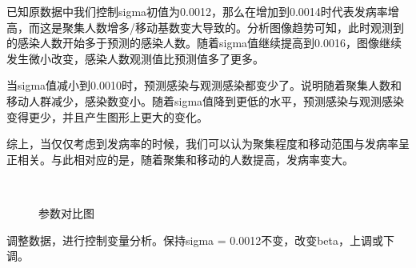 \documentclass{cumcmthesis}
\begin{document}
已知原数据中我们控制sigma初值为0.0012，那么在增加到0.0014时代表发病率增高，而这是聚集人数增多/移动基数变大导致的。分析图像趋势可知，此时观测到的感染人数开始多于预测的感染人数。随着sigma值继续提高到0.0016，图像继续发⽣微小改变，感染人数观测值比预测值多了更多。

当sigma值减小到0.0010时，预测感染与观测感染都变少了。说明随着聚集人数和移动人群减少，感染数变小。随着sigma值降到更低的水平，预测感染与观测感染变得更少，并且产生图形上更⼤的变化。

综上，当仅仅考虑到发病率的时候，我们可以认为聚集程度和移动范围与发病率呈正相关。与此相对应的是，随着聚集和移动的人数提高，发病率变大。

\clearpage
\begin{figure}[!htb]
    \centering
    \hfill
     \\
    \hfill
    \caption{参数对比图}
\end{figure}
调整数据，进行控制变量分析。保持sigma = 0.0012不变，改变beta，上调或下调。
\end{document}
